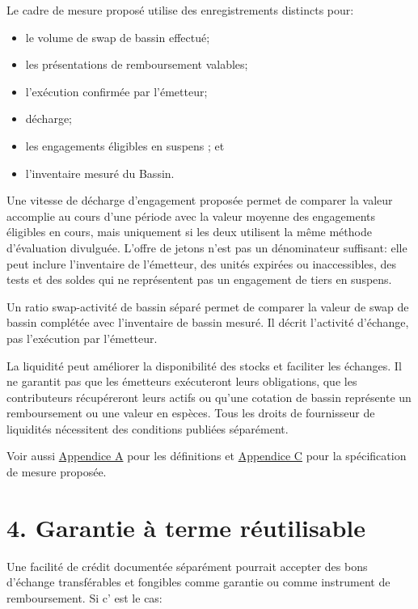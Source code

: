\documentclass[11pt]{article}
\begin{document}
Le cadre de mesure proposé utilise des enregistrements distincts pour:

\begin{itemize}[leftmargin=*]
\item le volume de swap de bassin effectué;
\item les présentations de remboursement valables;
\item l'exécution confirmée par l'émetteur;
\item décharge;
\item les engagements éligibles en suspens ; et
\item l'inventaire mesuré du Bassin.
\end{itemize}
Une vitesse de décharge d'engagement proposée permet de comparer la valeur accomplie au cours d'une période avec la valeur moyenne des engagements éligibles en cours, mais uniquement si les deux utilisent la même méthode d'évaluation divulguée. L'offre de jetons n'est pas un dénominateur suffisant: elle peut inclure l'inventaire de l'émetteur, des unités expirées ou inaccessibles, des tests et des soldes qui ne représentent pas un engagement de tiers en suspens.

Un ratio swap-activité de bassin séparé permet de comparer la valeur de swap de bassin complétée avec l'inventaire de bassin mesuré. Il décrit l'activité d'échange, pas l'exécution par l'émetteur.

La liquidité peut améliorer la disponibilité des stocks et faciliter les échanges. Il ne garantit pas que les émetteurs exécuteront leurs obligations, que les contributeurs récupéreront leurs actifs ou qu'une cotation de bassin représente un remboursement ou une valeur en espèces. Tous les droits de fournisseur de liquidités nécessitent des conditions publiées séparément.

Voir aussi \href{https://docs.cosmolocal.credit/fr/white-paper/appendix-a-math-box}{Appendice A} pour les définitions et \href{https://docs.cosmolocal.credit/fr/white-paper/appendix-c-kpi-definitions}{Appendice C} pour la spécification de mesure proposée.


\section*{4. Garantie à terme réutilisable}

Une facilité de crédit documentée séparément pourrait accepter des bons d'échange transférables et fongibles comme garantie ou comme instrument de remboursement. Si c' est le cas:
\end{document}
